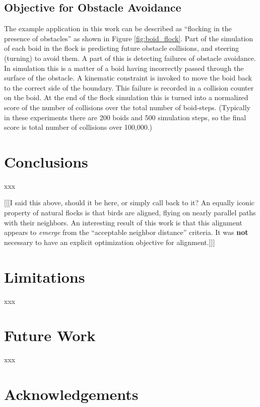 \documentclass[letterpaper]{article}
\begin{document}
\subsection{Objective for Obstacle Avoidance}
\label{subsec:avoidance_objective}

The example application in this work can be described as ``flocking in the presence of obstacles'' as shown in Figure \ref{fig:boid_flock}. Part of the simulation of each boid in the flock is predicting future obstacle collisions, and steering (turning) to avoid them. A part of this is detecting failures of obstacle avoidance. In simulation this is a matter of a boid having incorrectly passed through the surface of the obstacle. A kinematic constraint is invoked to move the boid back to the correct side of the boundary. This failure is recorded in a collision counter on the boid. At the end of the flock simulation this is turned into a normalized score of the number of collisions over the total number of boid-steps. (Typically in these experiments there are 200 boids and 500 simulation steps, so the final score is total number of collisions over 100,000.)

\section{Conclusions}
\label{sec:Conclusions}

xxx

[[[I said this above, should it be here, or simply call back to it? An equally iconic property of natural flocks is that birds are aligned, flying on nearly parallel paths with their neighbors. An interesting result of this work is that this alignment appears to \textit{emerge} from the ``acceptable neighbor distance'' criteria. It was \textbf{not} necessary to have an explicit optimization objective for alignment.]]]

\section{Limitations}
\label{sec:limitations}

xxx

\section{Future Work}
\label{sec:future}

xxx

\section{Acknowledgements}
\label{sec:ack}
\end{document}
